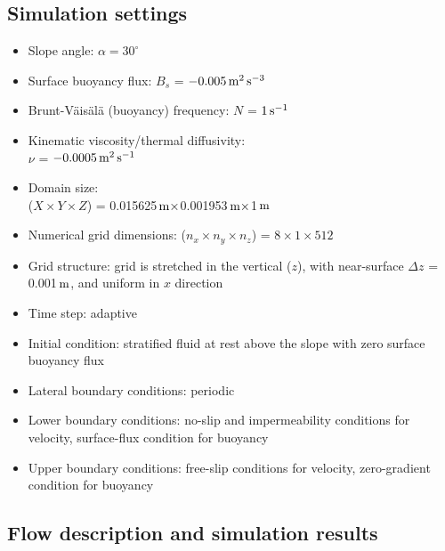 \documentclass[gmd]{copernicus}
\begin{document}
\subsection{Simulation settings}

\begin{itemize}
  
  \setlength{\itemsep}{0pt}
  \setlength{\parskip}{0pt}
  \setlength{\parsep}{0pt} 
  \item Slope angle: $\alpha = 30^{\circ}$
  \item Surface buoyancy flux: $B_{s} $ = $-0.005{\rm\, m}^{\rm 2}\, {\rm s}^{{\rm -3}} $
  \item Brunt-V\"{a}is\"{a}l\"{a} (buoyancy) frequency: $N$ = $1\,{\rm s}^{{\rm -1}}$
  \item Kinematic viscosity/thermal diffusivity: \\$\nu$ = $-0.0005{\rm\, m}^{\rm 2}\, {\rm s}^{{\rm -1}} $
  \item Domain size: \\($X{\times}Y{\times}Z$) = 0.015625${\rm\, m}\times$0.001953${\rm\, m}\times$1${\rm\, m}$
  \item Numerical grid dimensions: ($n_x{\times}n_y{\times}n_z$) = $8 \times 1 \times 512$
  \item Grid structure: grid is stretched in the vertical ($z$), with near-surface $\Delta z$ = 0.001${\rm\, m}$, and uniform in $x$ direction  
  \item Time step: adaptive
  \item Initial condition: stratified fluid at rest above the slope with zero surface buoyancy flux
  \item Lateral boundary conditions: periodic
  \item Lower boundary conditions: no-slip and impermeability conditions for velocity, surface-flux condition for buoyancy
  \item Upper boundary conditions: free-slip conditions for velocity, zero-gradient condition for buoyancy
\end{itemize}

\subsection{Flow description and simulation results}
\end{document}
